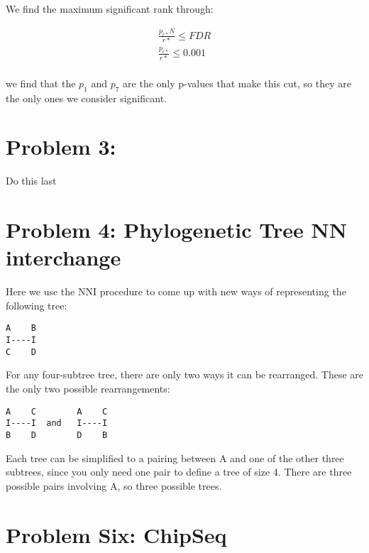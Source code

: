 \documentclass[10pt]{article} %
\begin{document}
We find the maximum significant rank through:

\begin{align*}
  \frac{p_{r*}N}{r*} \leq FDR\\
  \frac{p_{r*}}{r*} \leq 0.001\\
\end{align*}

we find that the $p_1$ and $p_7$ are the only p-values that make this cut, so they are the only
ones we consider significant.\\

\section{Problem 3: }
Do this last

\section{Problem 4: Phylogenetic Tree NN interchange}
Here we use the NNI procedure to come up with new ways of representing the following tree:

\begin{verbatim}
A    B
I----I
C    D
\end{verbatim}

For any four-subtree tree, there are only two ways it can be rearranged. These are the only
two possible rearrangements:

\begin{verbatim}
A    C        A    C
I----I  and   I----I
B    D        D    B
\end{verbatim}

Each tree can be simplified to a pairing between A and one of the other three subtrees, since
you only need one pair to define a tree of size 4. There are three possible pairs involving A,
so three possible trees.\\

\section{Problem Six: ChipSeq}
\end{document}
